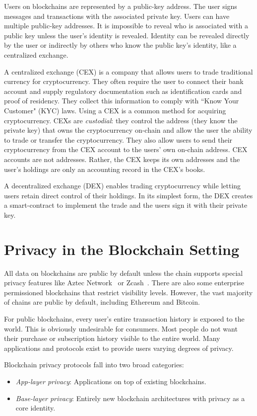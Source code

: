 \documentclass[9pt]{extreport}
\begin{document}
Users on blockchains are represented by a public-key address.  The user signs messages and transactions with the associated private key.  Users can have multiple public-key addresses.  It is impossible to reveal who is associated with a public key unless the user's identity is revealed.  Identity can be revealed directly by the user or indirectly by others who know the public key's identity, like a centralized exchange.

A centralized exchange (CEX) is a company that allows users to trade traditional currency for cryptocurrency.  They often require the user to connect their bank account and supply regulatory documentation such as identification cards and proof of residency.  They collect this information to comply with ``Know Your Customer" (KYC) laws.  Using a CEX is a common method for acquiring cryptocurrency.  CEXs are \textit{custodial}: they control the address (they know the private key) that owns the cryptocurrency on-chain and allow the user the ability to trade or transfer the cryptocurrency.  They also allow users to send their cryptocurrency from the CEX account to the users' own on-chain address.  CEX accounts are not addresses.  Rather, the CEX keeps its own addresses and the user's holdings are only an accounting record in the CEX's books.

A decentralized exchange (DEX) enables trading cryptocurrency while letting users retain direct control of their holdings.  In its simplest form, the DEX creates a smart-contract to implement the trade and the users sign it with their private key.

\section{Privacy in the Blockchain Setting}
All data on blockchains are public by default unless the chain supports special privacy features like Aztec Network~\cite{aztecprotocol} or Zcash~\cite{ZcashWhitepaper}.  There are also some enterprise permissioned blockchains that restrict visibility levels.  However, the vast majority of chains are public by default, including Ethereum and Bitcoin.

For public blockchains, every user's entire transaction history is exposed to the world.  This is obviously undesirable for consumers.  Most people do not want their purchase or subscription history visible to the entire world.  Many applications and protocols exist to provide users varying degrees of privacy.

Blockchain privacy protocols fall into two broad categories: 
\begin{itemize}
    \item \textit{App-layer privacy}: Applications on top of existing blockchains.
    \item \textit{Base-layer privacy}: Entirely new blockchain architectures with privacy as a core identity.
\end{itemize}
\end{document}
